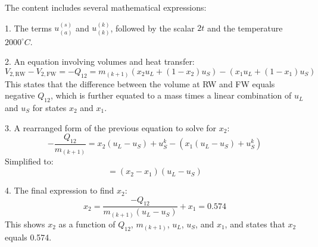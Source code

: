 The content includes several mathematical expressions:

1. The terms \( u_{(a)}^{(s)} \) and \( u_{(k)}^{(k)} \), followed by the scalar \( 2t \) and the temperature \( 2000^\circ C \).

2. An equation involving volumes and heat transfer:
   \[
   V_{2, \text{RW}} - V_{2, \text{FW}} = -Q_{12} = m_{(k+1)} \left( x_2 u_L + (1 - x_2) u_S \right) - \left( x_1 u_L + (1 - x_1) u_S \right)
   \]
   This states that the difference between the volume at RW and FW equals negative \( Q_{12} \), which is further equated to a mass times a linear combination of \( u_L \) and \( u_S \) for states \( x_2 \) and \( x_1 \).

3. A rearranged form of the previous equation to solve for \( x_2 \):
   \[
   -\frac{Q_{12}}{m_{(k+1)}} = x_2 (u_L - u_S) + u_S^k - (x_1 (u_L - u_S) + u_S^k)
   \]
   Simplified to:
   \[
   = (x_2 - x_1) (u_L - u_S)
   \]

4. The final expression to find \( x_2 \):
   \[
   x_2 = \frac{-Q_{12}}{m_{(k+1)} (u_L - u_S)} + x_1 = 0.574
   \]
   This shows \( x_2 \) as a function of \( Q_{12} \), \( m_{(k+1)} \), \( u_L \), \( u_S \), and \( x_1 \), and states that \( x_2 \) equals 0.574.